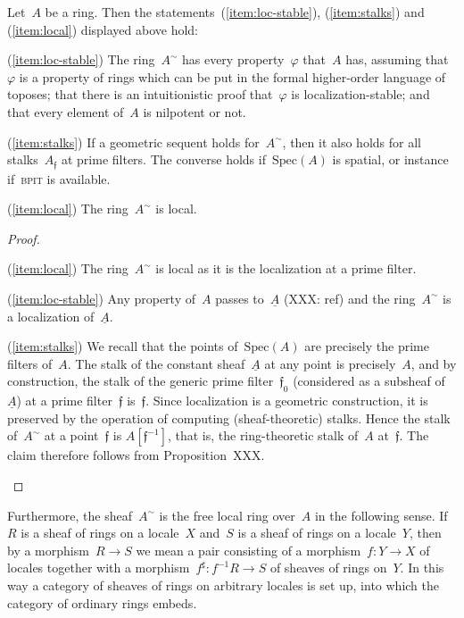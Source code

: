 \documentclass{ws-rv9x6}
\newcommand{\fff}{\mathfrak{f}}
\newcommand{\Spec}{\mathrm{Spec}}
\renewcommand{\_}{\mathpunct{.}}
\newcommand{\?}{\,{:}\,}
\newcommand{\BPIT}{\textsc{bpit}\xspace}
\begin{document}
\begin{proposition}\label{prop:immediate-consequences}
Let~$A$ be a ring. Then the statements~(\ref{item:loc-stable}), (\ref{item:stalks}) and
(\ref{item:local}) displayed above hold:
\begin{Alphlist}[(D)]
\item[(\ref{item:loc-stable})]
The ring~$A^\sim$ has every property~$\varphi$ that~$A$ has, assuming
that~$\varphi$ is a property of rings which can be put in the formal
higher-order language of toposes; that there is an intuitionistic proof
that~$\varphi$ is localization-stable; and that every element of~$A$ is
nilpotent or not.
\item[(\ref{item:stalks})]
If a geometric sequent holds for~$A^\sim$, then it also holds for all
stalks~$A_\fff$ at prime filters. The converse holds if~$\Spec(A)$ is spatial,
or instance if~\BPIT is available.
\item[(\ref{item:local})] The ring~$A^\sim$ is local.
\end{Alphlist}
\end{proposition}

\begin{proof}
\begin{Alphlist}[(D)]
\item[(\ref{item:local})] The ring~$A^\sim$ is local as it is the
localization at a prime filter.
\item[(\ref{item:loc-stable})] Any property of~$A$ passes to~$\underline{A}$
(XXX: ref) and the ring~$A^\sim$ is a localization of~$\underline{A}$.
\item[(\ref{item:stalks})] We recall that the points of~$\Spec(A)$ are
precisely the prime filters of~$A$. The stalk of the constant
sheaf~$\underline{A}$ at any point is precisely~$A$, and by construction, the
stalk of the generic prime filter~$\fff_0$ (considered as a subsheaf
of~$\underline{A}$) at a prime filter~$\fff$ is~$\fff$. Since localization is a
geometric construction, it is preserved by the operation of computing
(sheaf-theoretic) stalks. Hence the stalk of~$A^\sim$ at a point~$\fff$ is
$A[\fff^{-1}]$, that is, the ring-theoretic stalk of~$A$ at~$\fff$. The claim
therefore follows from Proposition~XXX.\qedhere
\end{Alphlist}
\end{proof}

Furthermore, the sheaf~$A^\sim$ is the free local ring over~$A$ in the
following sense. If~$R$ is a sheaf of rings on a locale~$X$ and~$S$ is a sheaf
of rings on a locale~$Y$, then by a morphism~$R \to S$ we mean a pair
consisting of a morphism~$f : Y \to X$ of locales together with a
morphism~$f^\sharp : f^{-1}R \to S$ of sheaves of rings on~$Y$.
In this way a category of sheaves of rings on arbitrary locales is set up, into
which the category of ordinary rings embeds.
\end{document}
